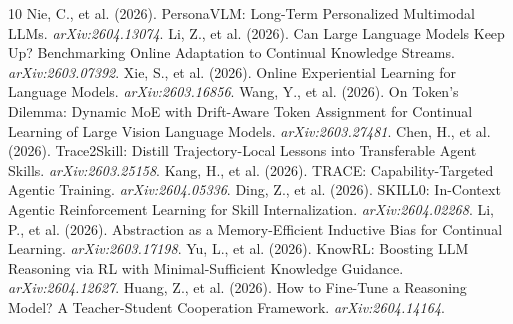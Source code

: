\documentclass[11pt]{article}
\begin{document}
\begin{thebibliography}{10}
 Nie, C., et al. (2026). PersonaVLM: Long-Term Personalized Multimodal LLMs. \textit{arXiv:2604.13074}.
 Li, Z., et al. (2026). Can Large Language Models Keep Up? Benchmarking Online Adaptation to Continual Knowledge Streams. \textit{arXiv:2603.07392}.
 Xie, S., et al. (2026). Online Experiential Learning for Language Models. \textit{arXiv:2603.16856}.
 Wang, Y., et al. (2026). On Token's Dilemma: Dynamic MoE with Drift-Aware Token Assignment for Continual Learning of Large Vision Language Models. \textit{arXiv:2603.27481}.
 Chen, H., et al. (2026). Trace2Skill: Distill Trajectory-Local Lessons into Transferable Agent Skills. \textit{arXiv:2603.25158}.
 Kang, H., et al. (2026). TRACE: Capability-Targeted Agentic Training. \textit{arXiv:2604.05336}.
 Ding, Z., et al. (2026). SKILL0: In-Context Agentic Reinforcement Learning for Skill Internalization. \textit{arXiv:2604.02268}.
 Li, P., et al. (2026). Abstraction as a Memory-Efficient Inductive Bias for Continual Learning. \textit{arXiv:2603.17198}.
 Yu, L., et al. (2026). KnowRL: Boosting LLM Reasoning via RL with Minimal-Sufficient Knowledge Guidance. \textit{arXiv:2604.12627}.
 Huang, Z., et al. (2026). How to Fine-Tune a Reasoning Model? A Teacher-Student Cooperation Framework. \textit{arXiv:2604.14164}.
\end{thebibliography}
\end{document}
